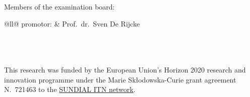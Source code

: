 \clearpage
\thispagestyle{empty}
\null%
\label{thesis:committee}
\vfill
{}

\noindent Members of the examination board:

\medskip\noindent
\begin{tabular}{@{}ll@{}}
  \quad{}promotor: & Prof.\ dr.\ Sven De Rijcke \\
\\
 \\
\\
\end{tabular}

This research was funded by the European Union's Horizon 2020 research and innovation programme under the Marie Sk\l odowska-Curie
grant agreement N.~721463 to the \href{www.astro.rug.nl/~sundial}{SUNDIAL ITN network}.
